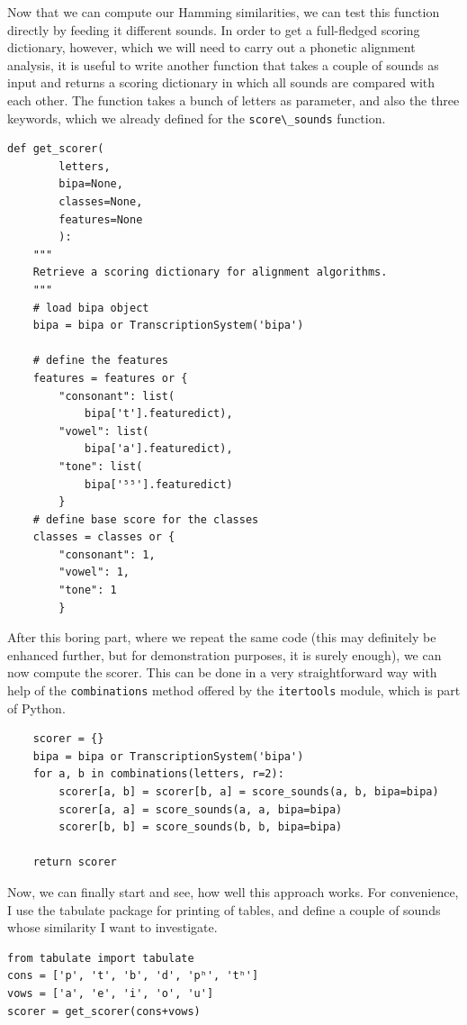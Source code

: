 \documentclass[
  a4paper,
  14pt,
  oneside,
  tablecaptionabove
]{scrbook}
\newcommand{\passthrough}[1]{#1}
\begin{document}
Now that we can compute our Hamming similarities, we can test this
function directly by feeding it different sounds. In order to get a
full-fledged scoring dictionary, however, which we will need to carry
out a phonetic alignment analysis, it is useful to write another
function that takes a couple of sounds as input and returns a scoring
dictionary in which all sounds are compared with each other. The
function takes a bunch of letters as parameter, and also the three
keywords, which we already defined for the
\passthrough{\lstinline!score\_sounds!} function.

\begin{lstlisting}
def get_scorer(
        letters,
        bipa=None,
        classes=None,
        features=None
        ):
    """
    Retrieve a scoring dictionary for alignment algorithms.
    """
    # load bipa object
    bipa = bipa or TranscriptionSystem('bipa')

    # define the features
    features = features or {
        "consonant": list(
            bipa['t'].featuredict),
        "vowel": list(
            bipa['a'].featuredict),
        "tone": list(
            bipa['⁵⁵'].featuredict)
        }
    # define base score for the classes
    classes = classes or {
        "consonant": 1,
        "vowel": 1,
        "tone": 1
        }
\end{lstlisting}

After this boring part, where we repeat the same code (this may
definitely be enhanced further, but for demonstration purposes, it is
surely enough), we can now compute the scorer. This can be done in a
very straightforward way with help of the
\passthrough{\lstinline!combinations!} method offered by the
\passthrough{\lstinline!itertools!} module, which is part of Python.

\begin{lstlisting}
    scorer = {}
    bipa = bipa or TranscriptionSystem('bipa')
    for a, b in combinations(letters, r=2):
        scorer[a, b] = scorer[b, a] = score_sounds(a, b, bipa=bipa)
        scorer[a, a] = score_sounds(a, a, bipa=bipa)
        scorer[b, b] = score_sounds(b, b, bipa=bipa)

    return scorer
\end{lstlisting}

Now, we can finally start and see, how well this approach works. For
convenience, I use the tabulate package for printing of tables, and
define a couple of sounds whose similarity I want to investigate.

\begin{lstlisting}
from tabulate import tabulate
cons = ['p', 't', 'b', 'd', 'pʰ', 'tʰ']
vows = ['a', 'e', 'i', 'o', 'u']
scorer = get_scorer(cons+vows)
\end{lstlisting}
\end{document}
